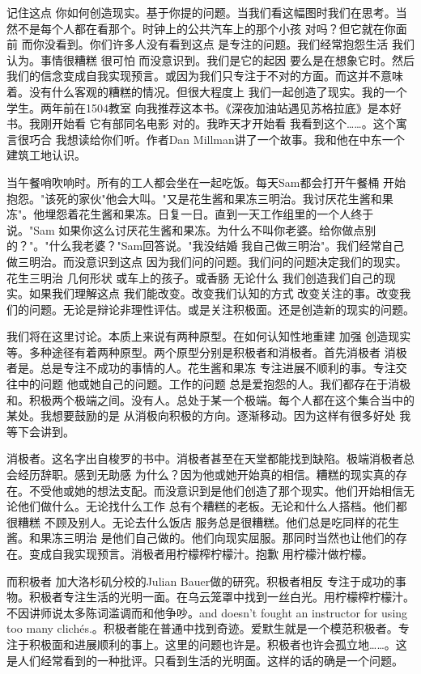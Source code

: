 记住这点 你如何创造现实。基于你提的问题。当我们看这幅图时我们在思考。当然不是每个人都在看那个。时钟上的公共汽车上的那个小孩 对吗？但它就在你面前 而你没看到。你们许多人没有看到这点 是专注的问题。我们经常抱怨生活 我们认为。事情很糟糕 很可怕 而没意识到。我们是它的起因 要么是在想象它时。然后我们的信念变成自我实现预言。或因为我们只专注于不对的方面。而这并不意味着。没有什么客观的糟糕的情况。但很大程度上 我们一起创造了现实。我的一个学生。两年前在1504教室 向我推荐这本书。《深夜加油站遇见苏格拉底》是本好书。我刚开始看 它有部同名电影 对的。我昨天才开始看 我看到这个……。这个寓言很巧合 我想读给你们听。作者Dan Millman讲了一个故事。我和他在中东一个建筑工地认识。 

当午餐哨吹响时。所有的工人都会坐在一起吃饭。每天Sam都会打开午餐桶 开始抱怨。"该死的家伙"他会大叫。"又是花生酱和果冻三明治。我讨厌花生酱和果冻"。他埋怨着花生酱和果冻。日复一日。直到一天工作组里的一个人终于说。"Sam 如果你这么讨厌花生酱和果冻。为什么不叫你老婆。给你做点别的？"。"什么我老婆？"Sam回答说。"我没结婚 我自己做三明治"。我们经常自己做三明治。而没意识到这点 因为我们问的问题。我们问的问题决定我们的现实。花生三明治 几何形状 或车上的孩子。或香肠 无论什么 我们创造我们自己的现实。如果我们理解这点 我们能改变。改变我们认知的方式 改变关注的事。改变我们的问题。无论是辩论非理性评估。或是关注积极面。还是创造新的现实的问题。 

我们将在这里讨论。本质上来说有两种原型。在如何认知性地重建 加强 创造现实等。多种途径有着两种原型。两个原型分别是积极者和消极者。首先消极者 消极者是。总是专注不成功的事情的人。花生酱和果冻 专注进展不顺利的事。专注交往中的问题 他或她自己的问题。工作的问题 总是爱抱怨的人。我们都存在于消极和。积极两个极端之间。没有人。总处于某一个极端。每个人都在这个集合当中的某处。我想要鼓励的是 从消极向积极的方向。逐渐移动。因为这样有很多好处 我等下会讲到。 

消极者。这名字出自梭罗的书中。消极者甚至在天堂都能找到缺陷。极端消极者总会经历辞职。感到无助感 为什么？因为他或她开始真的相信。糟糕的现实真的存在。不受他或她的想法支配。而没意识到是他们创造了那个现实。他们开始相信无论他们做什么。无论找什么工作 总有个糟糕的老板。无论和什么人搭档。他们都很糟糕 不顾及别人。无论去什么饭店 服务总是很糟糕。他们总是吃同样的花生酱。和果冻三明治 是他们自己做的。他们向现实屈服。那同时当然也让他们的存在。变成自我实现预言。消极者用柠檬榨柠檬汁。抱歉 用柠檬汁做柠檬。 

而积极者 加大洛杉矶分校的Julian Bauer做的研究。积极者相反 专注于成功的事物。积极者专注生活的光明一面。在乌云笼罩中找到一丝白光。用柠檬榨柠檬汁。不因讲师说太多陈词滥调而和他争吵。and doesn't fought an instructor for using too many clichés.。积极者能在普通中找到奇迹。爱默生就是一个模范积极者。专注于积极面和进展顺利的事上。这里的问题也许是。积极者也许会孤立地……。这是人们经常看到的一种批评。只看到生活的光明面。这样的话的确是一个问题。 

